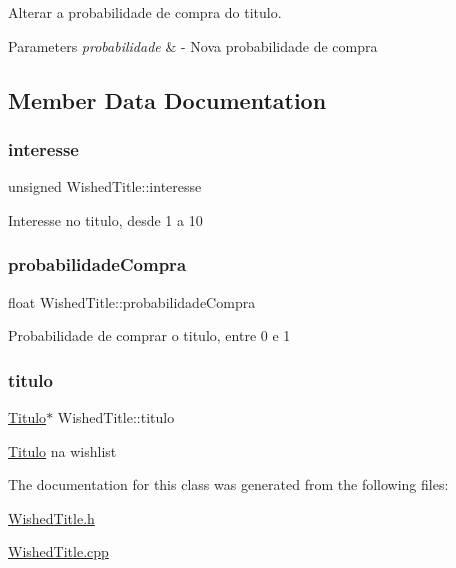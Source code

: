 Alterar a probabilidade de compra do titulo. 


\begin{DoxyParams}{Parameters}
{\em probabilidade} & -\/ Nova probabilidade de compra \\
\hline
\end{DoxyParams}


\subsection{Member Data Documentation}
\mbox{\label{class_wished_title_ae2a507c7b927da32f5e86c084ad56bda}} 
\subsubsection{\texorpdfstring{interesse}{interesse}}
{\footnotesize\ttfamily unsigned Wished\+Title\+::interesse\hspace{0.3cm}{\ttfamily [private]}}

Interesse no titulo, desde 1 a 10 \mbox{\label{class_wished_title_a7d9e984289d16e68fd0a8a058a258586}} 
\subsubsection{\texorpdfstring{probabilidade\+Compra}{probabilidadeCompra}}
{\footnotesize\ttfamily float Wished\+Title\+::probabilidade\+Compra\hspace{0.3cm}{\ttfamily [private]}}

Probabilidade de comprar o titulo, entre 0 e 1 \mbox{\label{class_wished_title_afd2c4392f474c68763f1e81ee3c30120}} 
\subsubsection{\texorpdfstring{titulo}{titulo}}
{\footnotesize\ttfamily \mbox{\hyperlink{class_titulo}{Titulo}}$\ast$ Wished\+Title\+::titulo\hspace{0.3cm}{\ttfamily [private]}}

\mbox{\hyperlink{class_titulo}{Titulo}} na wishlist 

The documentation for this class was generated from the following files\+:\begin{DoxyCompactItemize}
\item 
\mbox{\hyperlink{_wished_title_8h}{Wished\+Title.\+h}}\item 
\mbox{\hyperlink{_wished_title_8cpp}{Wished\+Title.\+cpp}}\end{DoxyCompactItemize}
